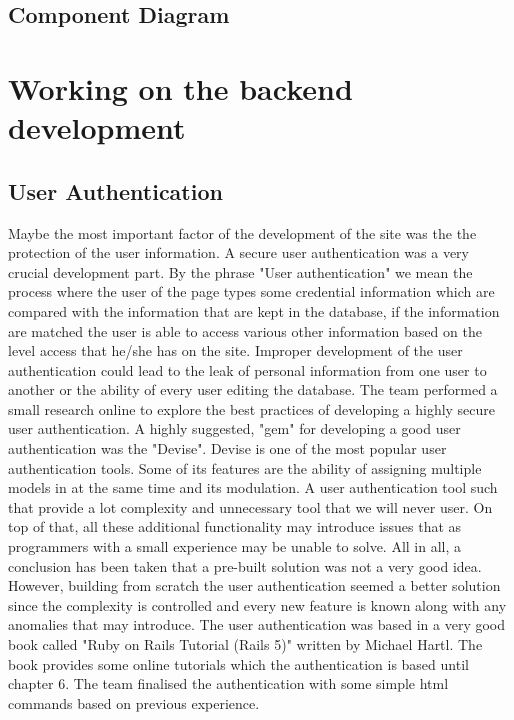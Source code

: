 \documentclass{l3proj}
\begin{document}
 

\subsection{Component Diagram}
\label{sec:component}


\section{Working on the backend development}
\label{sec:backend}


\subsection{User Authentication}
\label{sec:authentication} 

Maybe the most important factor of the development of the site was the the protection of the user information.  A secure user authentication was a very crucial development part. By the phrase "User authentication" we mean the process where the user of the page types some credential information which are compared with the information that are kept in the database, if the information are matched the user is able to access various other information based on the level access that he/she has on the site. Improper development of the user authentication could lead to the leak of personal information from one user to another or the ability of every user editing the database. The team performed a small research online to explore the best practices of developing a highly secure user authentication. A highly suggested, "gem" for developing a good user authentication was the "Devise". Devise is one of the most popular user authentication tools. Some of its features are the ability of assigning multiple models in at the same time and its modulation. A user authentication tool such that provide a lot complexity and unnecessary tool that we will never user. On top of that, all these additional functionality may introduce issues that as programmers with a small experience may be unable to solve. All in all, a conclusion has been taken that a pre-built solution was not a very good idea. However, building from scratch the user authentication seemed a better solution since the complexity is controlled and every new feature is known along with any anomalies that may introduce. The user authentication was based in a very good book called "Ruby on Rails Tutorial (Rails 5)" written by Michael Hartl. The book provides some online tutorials which the authentication is based until chapter 6. The team finalised the authentication with some simple html commands based on previous experience.
\end{document}
